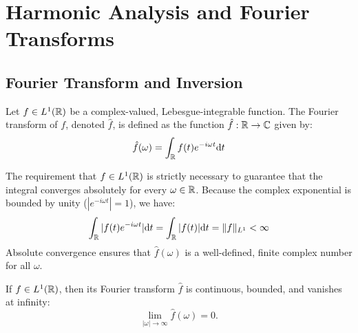 \section{Harmonic Analysis and Fourier Transforms}

\subsection{Fourier Transform and Inversion}

\begin{definition}
Let $f \in L^1(\mathbb{R})$ be a complex-valued, Lebesgue-integrable function. The Fourier transform of $f$, denoted $\hat{f}$, is defined as the function $\hat{f}: \mathbb{R} \to \mathbb{C}$ given by:
\begin{equation}
\hat{f}(\omega) = \int_{\mathbb{R}} f(t) e^{-i\omega t} \mathrm{d} t
\end{equation}

\end{definition}

\begin{remark}[Why $L^1(\R)$?]
The requirement that $f \in L^1(\mathbb{R})$ is strictly necessary to guarantee that the integral converges absolutely for every $\omega \in \mathbb{R}$. Because the complex exponential is bounded by unity ($|e^{-i\omega t}| = 1$), we have:
\begin{equation}
\int_{\mathbb{R}} |f(t) e^{-i\omega t}| \mathrm{d} t = \int_{\mathbb{R}} |f(t)| \mathrm{d} t = \|f\|_{L^1} < \infty
\end{equation}
Absolute convergence ensures that $\hat{f}(\omega)$ is a well-defined, finite complex number for all $\omega$.
\end{remark}

\begin{lemma}
If $f \in L^1(\mathbb{R})$, then its Fourier transform $\hat{f}$ is continuous, bounded, and vanishes at infinity:
\[
\lim_{|\omega| \to \infty} \hat{f}(\omega) = 0.
\]

\end{lemma}


